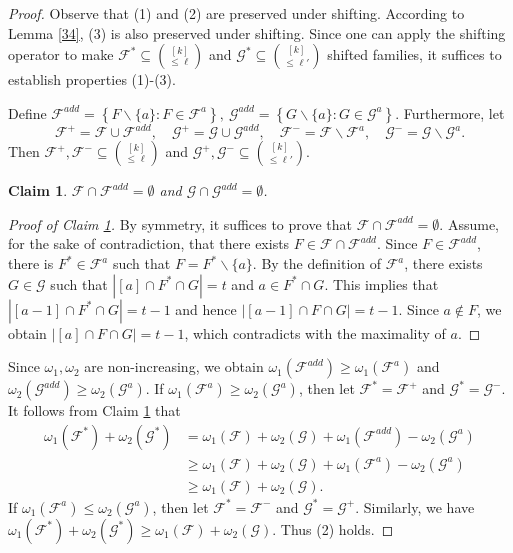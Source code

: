 \documentclass[11pt]{article}
\newtheorem{claim}{Claim}
\begin{document}
\begin{proof}
Observe that (1) and (2) are preserved under shifting. According to Lemma \ref{34}, 
(3) is also preserved under shifting.
 Since one can apply the shifting operator to make $\mathcal{F}^*\subseteq\binom{[k]}{\leq \ell}$ and $\mathcal{G}^* \subseteq\binom{[k]}{\leq \ell'}$ shifted families, it suffices to establish properties (1)-(3).

Define
    $
    \mathcal{F}^{add}=\left\{F\backslash\{a\} : F\in \mathcal{F}^a   \right\},\ \mathcal{G}^{add}=\left\{G\backslash\{a\} : G\in \mathcal{G}^a   \right\}.
    $
Furthermore, let 
$$\mathcal{F}^+=\mathcal{F}\cup\mathcal{F}^{add},\quad \mathcal{G}^+=\mathcal{G}\cup\mathcal{G}^{add},\quad \mathcal{F}^-=\mathcal{F}\backslash\mathcal{F}^{a},\quad \mathcal{G}^-=\mathcal{G}\backslash\mathcal{G}^{a}.$$
Then  $\mathcal{F}^+, \mathcal{F}^-\subseteq \binom{[k]}{\leq \ell}$ and 
$\mathcal{G}^+, \mathcal{G}^-\subseteq \binom{[k]}{\leq \ell'}$.
\begin{claim}\label{cl1}
$\mathcal{F}\cap\mathcal{F}^{add}=\emptyset$ and $\mathcal{G}\cap\mathcal{G}^{add}=\emptyset$.
    \end{claim}
    \begin{proof}[Proof of Claim \ref{cl1}]
By symmetry, it suffices to prove that $\mathcal{F}\cap\mathcal{F}^{add}=\emptyset$.
        Assume, for the sake of contradiction, that  there exists $F\in\mathcal{F}\cap\mathcal{F}^{add}$.
     Since $F\in\mathcal{F}^{add}$, there is $F^*\in\mathcal{F}^a$
such that $F=F^*\backslash \{a\}$. By the definition of 
$\mathcal{F}^a$, there exists  $G\in \mathcal{G}$
 such that 
        $|[a]\cap F^*\cap G|=t$
        and $a\in F^*\cap G$.
This implies that $|[a-1]\cap F^*\cap G|=t-1$ and hence
        $
        |[a-1]\cap F\cap G|=t-1.
        $
Since $a\notin F$,  we obtain $|[a]\cap F\cap G|=t-1$, which contradicts with the maximality of $a$.
    \end{proof}

Since $ \omega_1, \omega_2$ are non-increasing, we obtain $\omega_1(\mathcal{F}^{add})\geq \omega_1(\mathcal{F}^a)$ and $\omega_2(\mathcal{G}^{add})\geq \omega_2(\mathcal{G}^a)$.
If $\omega_1(\mathcal{F}^a)\geq \omega_2(\mathcal{G}^a)$, then let
 $\mathcal{F}^*= \mathcal{F}^+$ and $\mathcal{G}^*=\mathcal{G}^-$.
It follows from Claim \ref{cl1} that
 \begin{align*}
       \omega_1(\mathcal{F}^*)+\omega_2(\mathcal{G}^*)&= \omega_1(\mathcal{F})+\omega_2(\mathcal{G})+\omega_1(\mathcal{F}^{add})-\omega_2(\mathcal{G}^a)\\
       &\geq\omega_1(\mathcal{F})+\omega_2(\mathcal{G})+\omega_1(\mathcal{F}^{a})-\omega_2(\mathcal{G}^a)\\
&\geq \omega_1(\mathcal{F})+\omega_2(\mathcal{G}).
        \end{align*}
If $\omega_1(\mathcal{F}^a)\leq \omega_2(\mathcal{G}^a)$, then let
 $\mathcal{F}^*= \mathcal{F}^-$ and $\mathcal{G}^*=\mathcal{G}^+$.
Similarly, we have $\omega_1(\mathcal{F}^*)+\omega_2(\mathcal{G}^*)\geq \omega_1(\mathcal{F})+\omega_2(\mathcal{G})$. Thus (2) holds.


\end{proof}
\end{document}
